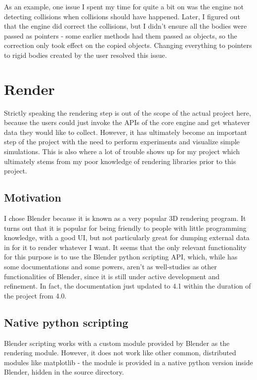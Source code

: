\documentclass[12pt,a4paper,twoside,openright]{report}
\begin{document}
As an example, one issue I spent my time for quite a bit on was the engine not detecting collisions when collisions should have happened. Later, I figured out that the engine did correct the collisions, but I didn't ensure all the bodies were passed as pointers - some earlier methods had them passed as objects, so the correction only took effect on the copied objects. Changing everything to pointers to rigid bodies created by the user resolved this issue.

\section{Render}\label{renderimplbl}

Strictly speaking the rendering step is out of the scope of the actual project here, because the users could just invoke the APIs of the core engine and get whatever data they would like to collect. However, it has ultimately become an important step of the project with the need to perform experiments and visualize simple simulations. This is also where a lot of trouble shows up for my project which ultimately stems from my poor knowledge of rendering libraries prior to this project.

\subsection{Motivation}

I chose Blender because it is known as a very popular 3D rendering program. It turns out that it is popular for being friendly to people with little programming knowledge, with a good UI, but not particularly great for dumping external data in for it to render whatever I want. It seems that the only relevant functionality for this purpose is to use the Blender python scripting API, which, while has some documentations and some powers, aren't as well-studies as other functionalities of Blender, since it is still under active development and refinement. In fact, the documentation just updated to 4.1\cite{blenderdoc} within the duration of the project from 4.0.

\subsection{Native python scripting}

Blender scripting works with a custom module provided by Blender as the rendering module. However, it does not work like other common, distributed modules like matplotlib - the module is provided in a native python version inside Blender, hidden in the source directory.
\end{document}
